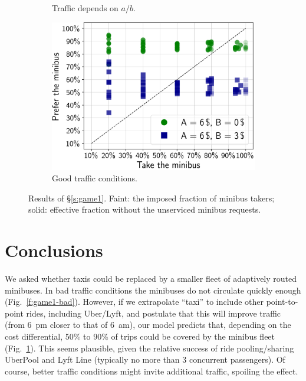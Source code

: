\documentclass[12pt,notitlepage]{article}
\begin{document}
\begin{figure}
\begin{subfigure}{0.32\textwidth}
	\caption{Traffic depends on $a/b$.}
	\label{f:game1}
\end{subfigure}
%
\hfill
%
\begin{subfigure}{0.32\textwidth}
	\includegraphics[width=\textwidth]{20210616-OPT1/c_grid_study1b/UTC-20210623-191629/e_evo_plots/evo__graph_h=6__graph_ttt_factor=1}
	
	\caption{Good traffic conditions.}
	\label{f:game1-good}
\end{subfigure}

\caption{%
	Results of \S\ref{s:game1}.
	Faint: the imposed fraction of minibus takers;
	solid: effective fraction without the unserviced minibus requests.
}
\end{figure}





\section{Conclusions}

We asked whether taxis could be 
replaced
by a smaller fleet of adaptively routed minibuses.
%
%
In bad traffic conditions
the minibuses do not circulate quickly enough 
(Fig.~\ref{f:game1-bad}).
%
%
However,
if we extrapolate ``taxi'' to include
other point-to-point rides,
including Uber/Lyft,
and postulate that this will improve traffic 
(from \SI{6}{pm} closer to that of \SI{6}{am}),
our model predicts
that,
depending on the cost differential,
50\% to 90\% of trips could be covered by
the minibus fleet (Fig.~\ref{f:game1}).
%
This seems plausible,
given the relative success of ride pooling/sharing
UberPool and Lyft Line
(typically no more than 3 concurrent passengers).
%
%
Of course, better traffic conditions might 
invite additional traffic,
spoiling the effect.
\end{document}
